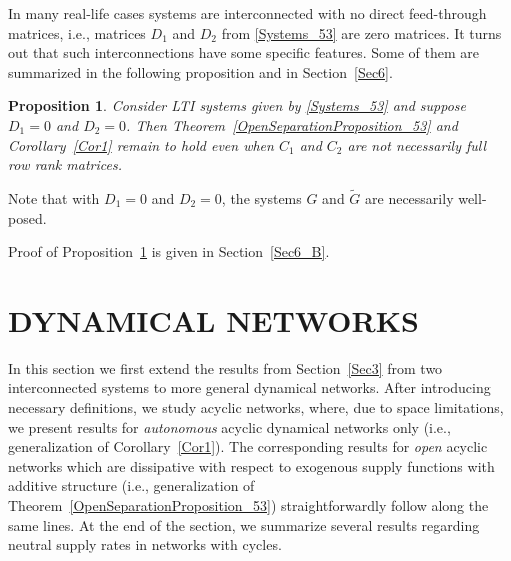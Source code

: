 \documentclass[11pt,a4paper,oneside,DIV=12,headings=small]{scrartcl}
\newtheorem{proposition}[theorem]{Proposition}
\theoremstyle{plain}
\newtheorem{remark}[theorem]{Remark}
\begin{document}
In many real-life cases systems are interconnected with no direct feed-through matrices, i.e., matrices $D_1$ and $D_2$ from \eqref{Systems_53} are zero matrices. It turns out that such interconnections have some specific features. Some of them are summarized in the following proposition and in Section~\ref{Sec6}. 

\begin{proposition}
\label{PropositionRank}
Consider LTI systems given by \eqref{Systems_53} and suppose $D_1=0$ and $D_2=0$. Then Theorem~\ref{OpenSeparationProposition_53} and Corollary~\ref{Cor1} remain to hold even when $C_1$ and $C_2$ are not necessarily full row rank matrices. 
\end{proposition}

Note that with $D_1=0$ and $D_2=0$, the systems $G$ and $\tilde{G}$ are necessarily well-posed.

Proof of Proposition~\ref{PropositionRank} is given in Section~\ref{Sec6_B}.
%


\section{DYNAMICAL NETWORKS}
\label{Sec4}

In this section we first extend the results from Section~\ref{Sec3} from two interconnected systems to more general dynamical networks. After introducing necessary definitions, we study acyclic networks, where, due to space limitations, we present results for \emph{autonomous} acyclic dynamical networks only (i.e., generalization of Corollary~\ref{Cor1}). The corresponding results for \emph{open} acyclic networks which are dissipative with respect to exogenous supply functions with additive structure (i.e., generalization of Theorem~\ref{OpenSeparationProposition_53}) straightforwardly follow along the same lines. 
At the end of the section, we summarize several results regarding neutral supply rates in networks with cycles. 
\end{document}
